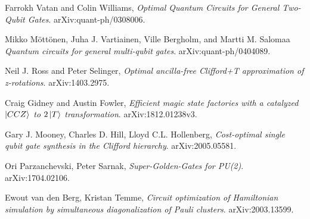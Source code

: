 \documentclass{article}
\theoremstyle{definition}
\theoremstyle{theorem}
\theoremstyle{remark}
\begin{document}
\begin{thebibliography}{9}

 Farrokh Vatan and Colin Williams, \emph{Optimal Quantum Circuits for General Two-Qubit Gates}. arXiv:quant-ph/0308006.

 Mikko M\"ott\"onen, Juha J. Vartiainen, Ville Bergholm, and Martti M. Salomaa \emph{Quantum circuits for general multi-qubit gates}. arXiv:quant-ph/0404089.

 Neil J. Ross and Peter Selinger, \emph{Optimal ancilla-free Clifford+T approximation of z-rotations}. arXiv:1403.2975.

 Craig Gidney and Austin Fowler, \emph{Efficient magic state factories with a catalyzed $\ket{CCZ}$ to $2\ket{T}$ transformation}. arXiv:1812.01238v3.

 Gary J. Mooney, Charles D. Hill, Lloyd C.L. Hollenberg, \emph{Cost-optimal single qubit gate synthesis in the Clifford hierarchy}. arXiv:2005.05581.

 Ori Parzanchevski, Peter Sarnak, \emph{Super-Golden-Gates for PU(2)}. arXiv:1704.02106.

 Ewout van den Berg, Kristan Temme, \emph{Circuit optimization of Hamiltonian simulation by simultaneous diagonalization of Pauli clusters}. arXiv:2003.13599.

\end{thebibliography}
\end{document}

